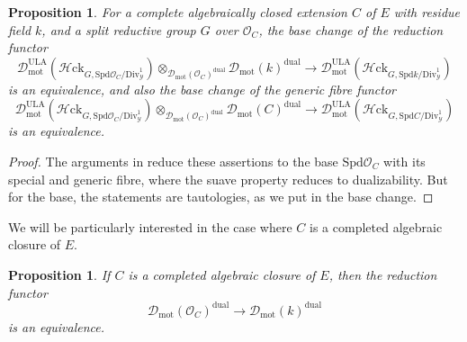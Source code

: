 \documentclass[11pt]{amsart}
\numberwithin{equation}{section}
\numberwithin{theorem}{section}
\newtheorem{proposition}[theorem]{Proposition}
\theoremstyle{definition}
\newcommand{\Hloc}{{\mathcal H}{\mathrm{ck}}}
\begin{document}
\begin{proposition}\label{prop:basechangeULAHloc} For a complete algebraically closed extension $C$ of $E$ with residue field $k$, and a split reductive group $G$ over $\mathcal O_C$, the base change of the reduction functor
\[
\mathcal D_{\mathrm{mot}}^{\mathrm{ULA}}(\Hloc_{G,\mathrm{Spd} \mathcal O_C/\mathrm{Div}^1_{\mathcal Y}})\otimes_{\mathcal D_{\mathrm{mot}}(\mathcal O_C)^{\mathrm{dual}}} \mathcal D_{\mathrm{mot}}(k)^{\mathrm{dual}}\to \mathcal D_{\mathrm{mot}}^{\mathrm{ULA}}(\Hloc_{G,\mathrm{Spd} k/\mathrm{Div}^1_{\mathcal Y}})
\]
is an equivalence, and also the base change of the generic fibre functor
\[
\mathcal D_{\mathrm{mot}}^{\mathrm{ULA}}(\Hloc_{G,\mathrm{Spd} \mathcal O_C/\mathrm{Div}^1_{\mathcal Y}})\otimes_{\mathcal D_{\mathrm{mot}}(\mathcal O_C)^{\mathrm{dual}}} \mathcal D_{\mathrm{mot}}(C)^{\mathrm{dual}}\to \mathcal D_{\mathrm{mot}}^{\mathrm{ULA}}(\Hloc_{G,\mathrm{Spd} C/\mathrm{Div}^1_{\mathcal Y}})
\]
is an equivalence.
\end{proposition}

\begin{proof} The arguments in \cite[Corollary VI.6.7]{FarguesScholze} reduce these assertions to the base $\mathrm{Spd}\mathcal O_C$ with its special and generic fibre, where the suave property reduces to dualizability. But for the base, the statements are tautologies, as we put in the base change.
\end{proof}

We will be particularly interested in the case where $C$ is a completed algebraic closure of $E$.

\begin{proposition} If $C$ is a completed algebraic closure of $E$, then the reduction functor
\[
\mathcal D_{\mathrm{mot}}(\mathcal O_C)^{\mathrm{dual}}\to \mathcal D_{\mathrm{mot}}(k)^{\mathrm{dual}}
\]
is an equivalence.
\end{proposition}
\end{document}
